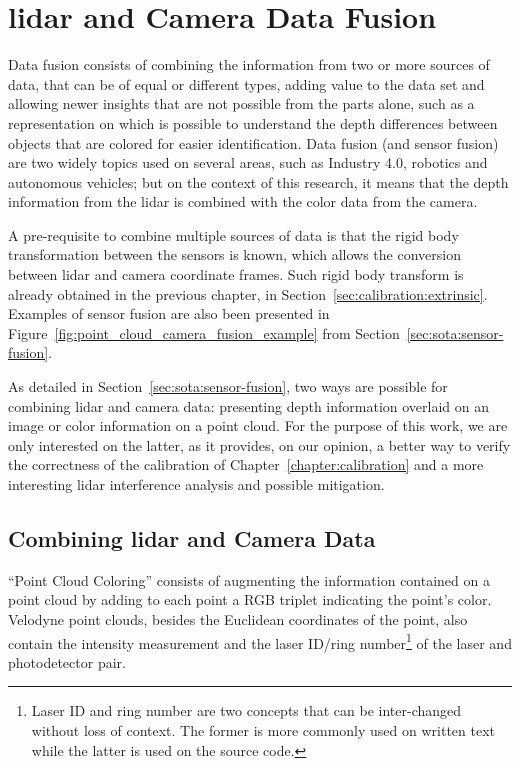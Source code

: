 \chapter{\acs{lidar} and Camera Data Fusion}
\label{chapter:sensor-fusion}

Data fusion consists of combining the information from two or more sources of data, that can be of equal or different types, adding value to the data set and allowing newer insights that are not possible from the parts alone, such as a representation on which is possible to understand the depth differences  between objects that are colored for easier identification. Data fusion (and sensor fusion) are two widely topics used on several areas, such as Industry 4.0, robotics and autonomous vehicles; but on the context of this research, it means that the depth information from the \ac{lidar} is combined with the color data from the camera.

A pre-requisite to combine multiple sources of data is that the rigid body transformation between the sensors is known, which allows the conversion between \ac{lidar} and camera coordinate frames. Such rigid body transform is already obtained in the previous chapter, in Section~\ref{sec:calibration:extrinsic}. Examples of sensor fusion are also been presented in Figure~\ref{fig:point_cloud_camera_fusion_example} from Section~\ref{sec:sota:sensor-fusion}.

As detailed in Section~\ref{sec:sota:sensor-fusion}, two ways are possible for combining \ac{lidar} and camera data: presenting depth information overlaid on an image or color information on a point cloud. For the purpose of this work, we are only interested on the latter, as it provides, on our opinion, a better way to verify the correctness of the calibration of Chapter~\ref{chapter:calibration} and a more interesting \ac{lidar} interference analysis and possible mitigation.

\section{Combining \acs{lidar} and Camera Data}
``Point Cloud Coloring'' consists of augmenting the information contained on a point cloud by adding to each point a RGB triplet indicating the point's color. Velodyne point clouds, besides the Euclidean coordinates of the point, also contain the intensity measurement and the laser ID/ring number\footnote{Laser ID and ring number are two concepts that can be inter-changed without loss of context. The former is more commonly used on written text while the latter is used on the source code.} of the laser and photodetector pair.

